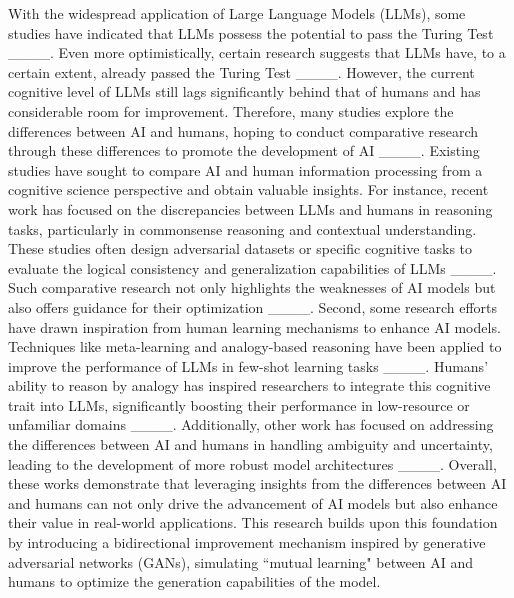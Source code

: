 With the widespread application of Large Language Models (LLMs), some studies have indicated that LLMs possess the potential to pass the Turing Test ____. Even more optimistically, certain research suggests that LLMs have, to a certain extent, already passed the Turing Test ____. However, the current cognitive level of LLMs still lags significantly behind that of humans and has considerable room for improvement. Therefore, many studies explore the differences between AI and humans, hoping to conduct comparative research through these differences to promote the development of AI ____. Existing studies have sought to compare AI and human information processing from a cognitive science perspective and obtain valuable insights. For instance, recent work has focused on the discrepancies between LLMs and humans in reasoning tasks, particularly in commonsense reasoning and contextual understanding. These studies often design adversarial datasets or specific cognitive tasks to evaluate the logical consistency and generalization capabilities of LLMs ____. Such comparative research not only highlights the weaknesses of AI models but also offers guidance for their optimization ____. Second, some research efforts have drawn inspiration from human learning mechanisms to enhance AI models. Techniques like meta-learning and analogy-based reasoning have been applied to improve the performance of LLMs in few-shot learning tasks ____. Humans' ability to reason by analogy has inspired researchers to integrate this cognitive trait into LLMs, significantly boosting their performance in low-resource or unfamiliar domains ____. Additionally, other work has focused on addressing the differences between AI and humans in handling ambiguity and uncertainty, leading to the development of more robust model architectures ____. Overall, these works demonstrate that leveraging insights from the differences between AI and humans can not only drive the advancement of AI models but also enhance their value in real-world applications. This research builds upon this foundation by introducing a bidirectional improvement mechanism inspired by generative adversarial networks (GANs), simulating ``mutual learning" between AI and humans to optimize the generation capabilities of the model.